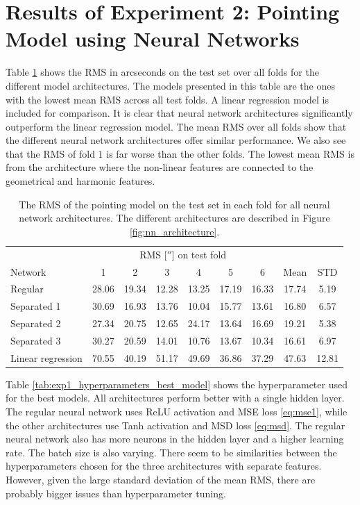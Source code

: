 \section{Results of Experiment 2: Pointing Model using Neural Networks}

Table \ref{tab:exp1_rms_folds_best_model} shows the RMS in arcseconds on the test set over all folds for the different model architectures.
The models presented in this table are the ones with the lowest mean RMS across all test folds.
A linear regression model is included for comparison. 
It is clear that neural network architectures significantly outperform the linear regression model.
The mean RMS over all folds show that the different neural network architectures offer similar performance.
We also see that the RMS of fold $1$ is far worse than the other folds.
The lowest mean RMS is from the architecture where the non-linear features are connected to the geometrical and harmonic features.\\

\begin{table}[!htbp]
    \centering
    \caption[RMS of each pointing model architecture on all test folds]{The RMS of the pointing model on the test set in each fold for all neural network architectures.
    The different architectures are described in Figure \ref{fig:nn_architecture}.}
    \begin{tabular}{lcccccccc}
        \toprule
        & \multicolumn{6}{c}{RMS [$''$] on test fold} & & \\
        \cmidrule(lr){2-7}
        Network & 1 & 2 & 3 & 4 & 5 & 6 & Mean & STD\\
        \midrule
        Regular           & 28.06 & 19.34 & 12.28 & 13.25 & 17.19 & 16.33 & 17.74 & 5.19 \\
        Separated 1       & 30.69 & 16.93 & 13.76 & 10.04 & 15.77 & 13.61 & 16.80 & 6.57 \\
        Separated 2       & 27.34 & 20.75 & 12.65 & 24.17 & 13.64 & 16.69 & 19.21 & 5.38 \\
        Separated 3       & 30.27 & 20.59 & 14.01 & 10.76 & 13.67 & 10.34 & 16.61 & 6.97 \\
        Linear regression & 70.55 & 40.19 & 51.17 & 49.69 & 36.86 & 37.29 & 47.63 & 12.81 \\
        \bottomrule
    \end{tabular}
    \label{tab:exp1_rms_folds_best_model}
\end{table}


Table \ref{tab:exp1_hyperparameters_best_model} shows the hyperparameter used for the best models.
All architectures perform better with a single hidden layer.
The regular neural network uses ReLU activation and MSE loss \eqref{eq:mse1}, while the other architectures use Tanh activation and MSD loss \eqref{eq:msd}.
The regular neural network also has more neurons in the hidden layer and a higher learning rate.
The batch size is also varying. There seem to be similarities between the hyperparameters chosen for the three architectures with separate features.
However, given the large standard deviation of the mean RMS, there are probably bigger issues than hyperparameter tuning.\\

